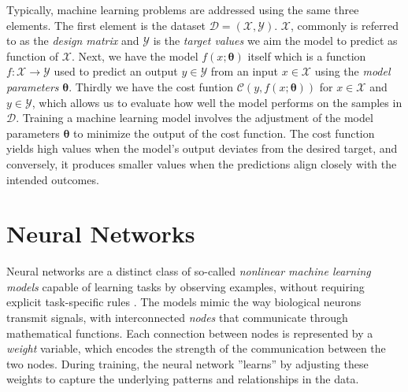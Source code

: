 \documentclass[a4paper, UKenglish, 11pt]{uiomaster}
\begin{document}
Typically, machine learning problems are addressed using the same three elements. The first element is the dataset $\mathcal{D} = (\mathcal{X}, \mathcal{Y})$. $\mathcal{X}$, commonly is referred to as the \emph{design matrix} and $\mathcal{Y}$ is the \emph{target values} we aim the model to predict as function of $\mathcal{X}$. Next, we have the model $f(x; \boldsymbol{\theta})$ itself which is a function $f : \mathcal{X} \to \mathcal{Y}$ used to predict an output $y \in \mathcal{Y}$ from an input $x \in \mathcal{X}$ using the \emph{model parameters} $\boldsymbol{\theta}$.
Thirdly we have the cost funtion $\mathcal{C}(y, f(x; \boldsymbol{\theta}))$ for $x \in \mathcal{X}$ and $y \in \mathcal{Y}$, which allows us to evaluate how well the model performs on the samples in $\mathcal{D}$. Training a machine learning model involves the adjustment of the model parameters $\boldsymbol{\theta}$ to minimize the output of the cost function. The cost function yields high values when the model's output deviates from the desired target, and conversely, it produces smaller values when the predictions align closely with the intended outcomes.


\section{Neural Networks}
Neural networks are a distinct class of so-called \emph{nonlinear machine learning models} capable of learning tasks by observing examples, without requiring explicit task-specific rules \cite{Hjorth-Jensen2022}. The models mimic the way biological neurons transmit signals, with interconnected \emph{nodes} that communicate through mathematical functions. Each connection between nodes is represented by a \emph{weight} variable, which encodes the strength of the communication between the two nodes. During training, the neural network ''learns'' by adjusting these weights to capture the underlying patterns and relationships in the data.
\end{document}
